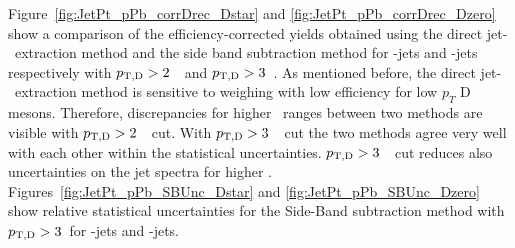 Figure~\ref{fig:JetPt_pPb_corrDrec_Dstar} and \ref{fig:JetPt_pPb_corrDrec_Dzero} show a comparison of the efficiency-corrected yields obtained using the direct jet-\pt\ extraction method 
and the side band subtraction method for \Dstar-jets and \Dzero-jets respectively with $p_{\mathrm{T,D}}>2$~\GeVc\ and $p_{\mathrm{T,D}}>3$~\GeVc. 
As mentioned before, the direct jet-\pt\ extraction method is sensitive to weighing with low efficiency for low $p_{T}$ D mesons. 
Therefore, discrepancies for higher \ptjet\ ranges between two methods are visible with $p_{\mathrm{T,D}}>2$~\GeVc\ cut. 
With $p_{\mathrm{T,D}}>3$~\GeVc\ cut the two methods agree very well with each other within the statistical uncertainties.
$p_{\mathrm{T,D}}>3$~\GeVc\ cut reduces also uncertainties on the jet spectra for higher \ptjet. 
Figures~\ref{fig:JetPt_pPb_SBUnc_Dstar} and \ref{fig:JetPt_pPb_SBUnc_Dzero} show relative statistical uncertainties for the Side-Band subtraction method with $p_{\mathrm{T,D}}>3$~\GeVc for \Dstar-jets and \Dzero-jets.


